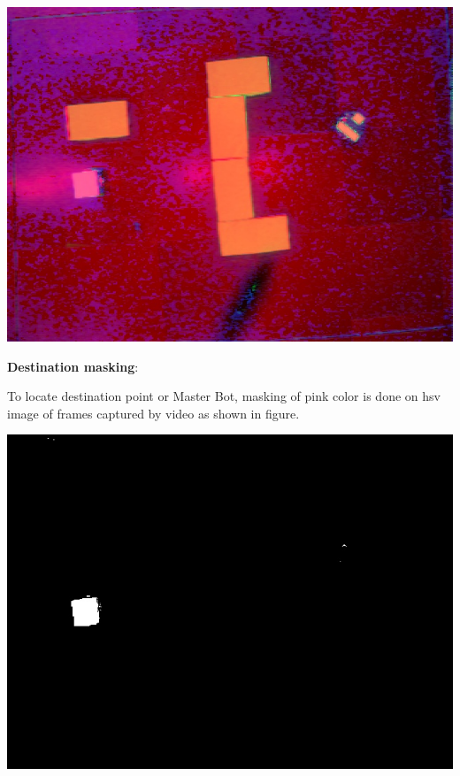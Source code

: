 \documentclass[report]{res}
\begin{document}
	\begin{center}
		\includegraphics[scale = 0.7]{graphics/case1/have_video.jpeg}\\
	\end{center}
	
	\pagebreak
	
	
	\textbf{Destination masking}:	
	
	To locate destination point or Master Bot, masking of pink color is done on hsv image of frames captured by video as shown in figure.
	
	\begin{center}
		\includegraphics[scale = 0.7]{graphics/case1/destination_mask.jpeg}\\
	\end{center}
	
\end{document}
